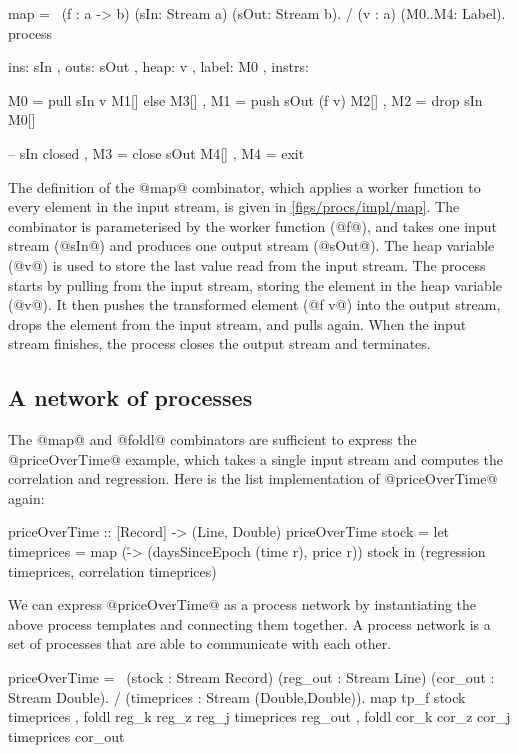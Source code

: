 \begin{process}[float,caption=Process implementation of \Hs/map/,label=figs/procs/impl/map]
map 
  = \ (f  : a -> b)
      (sIn: Stream a) (sOut: Stream b). 
    / (v  : a)        (M0..M4: Label).
    process
     { ins:    { sIn  }
     , outs:   { sOut }
     , heap:   { v }
     , label:  M0
     , instrs: { M0 = pull  sIn     v  M1[] else M3[]
               , M1 = push  sOut (f v) M2[]
               , M2 = drop  sIn        M0[]

               -- sIn closed
               , M3 = close sOut       M4[]
               , M4 = exit } }
\end{process}

The definition of the @map@ combinator, which applies a worker function to every element in the input stream, is given in \cref{figs/procs/impl/map}.
The combinator is parameterised by the worker function (@f@), and takes one input stream (@sIn@) and produces one output stream (@sOut@).
The heap variable (@v@) is used to store the last value read from the input stream.
The process starts by pulling from the input stream, storing the element in the heap variable (@v@).
It then pushes the transformed element (@f v@) into the output stream, drops the element from the input stream, and pulls again.
When the input stream finishes, the process closes the output stream and terminates.

\subsection{A network of processes}
The @map@ and @foldl@ combinators are sufficient to express the @priceOverTime@ example, which takes a single input stream and computes the correlation and regression.
Here is the list implementation of @priceOverTime@ again:

\begin{haskell}
priceOverTime :: [Record] -> (Line, Double)
priceOverTime stock =
  let timeprices = map (\r -> (daysSinceEpoch (time r), price r)) stock
  in (regression timeprices, correlation timeprices)
\end{haskell}

We can express @priceOverTime@ as a process network by instantiating the above process templates and connecting them together.
A process network is a set of processes that are able to communicate with each other.

\begin{process}
priceOverTime =
  \ (stock : Stream Record)
    (reg_out : Stream Line) (cor_out : Stream Double).
  / (timeprices : Stream (Double,Double)).
     { map    tp_f             stock      timeprices
     , foldl reg_k reg_z reg_j timeprices reg_out
     , foldl cor_k cor_z cor_j timeprices cor_out }
\end{process}

